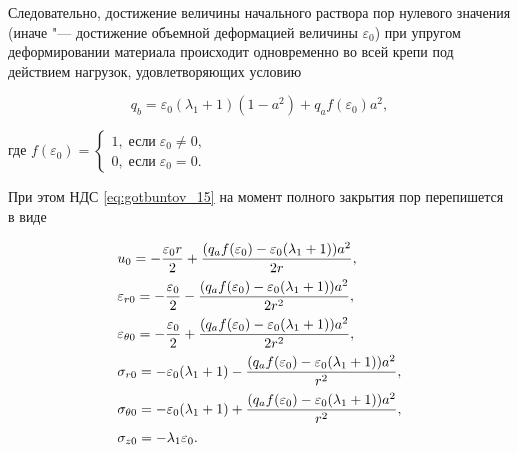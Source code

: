 Следовательно, достижение величины начального раствора пор нулевого значения (иначе "--- достижение объемной деформацией величины $\varepsilon_0$) при упругом деформировании материала происходит одновременно во всей крепи под действием нагрузок, удовлетворяющих условию 

\begin{equation} 

\label{eq:gotbuntov_17} 

q_b=\varepsilon_0(\lambda_1+1)(1-a^2)+q_a   f(\varepsilon_0)a^2,

\end{equation}                             

где $f(\varepsilon_0)=\left\{\begin{array}{c}{1, \; \text{если} \; \varepsilon_0\ne0}, \\ {0,\; \text{если} \; \varepsilon_0=0.}\end{array}\right.$



При этом НДС \eqref{eq:gotbuntov_15} на момент полного закрытия пор перепишется в виде

\begin{equation}

\begin{array}{l}

\displaystyle

u_0=-\frac{\varepsilon_0 r}{2}   +\frac{(q_a   f(\varepsilon_0)-\varepsilon_0(\lambda_1+1)) a^2}{2r}  ,

\\[3mm]

\displaystyle

\varepsilon_{r0}=-\frac{\varepsilon_0}{2}-\frac{ (q_a   f(\varepsilon_0)-\varepsilon_0(\lambda_1+1)) a^2}{2r^2} , \\[3mm]

\displaystyle

\varepsilon_{\theta0}=-\frac{\varepsilon_0}{2}+\frac{(q_a   f(\varepsilon_0)-\varepsilon_0(\lambda_1+1)) a^2}{2r^2},

\\[3mm] 

\displaystyle

\sigma_{r0}=-\varepsilon_0(\lambda_1+1)-\frac{(q_a   f(\varepsilon_0)-\varepsilon_0(\lambda_1+1))a^2}{r^2},%

\\[3mm] 

\displaystyle

\sigma_{\theta0}=-\varepsilon_0(\lambda_1+1)+\frac{(q_a   f(\varepsilon_0)-\varepsilon_0(\lambda_1+1))a^2}{r^2},

\displaystyle

\\[3mm] 

\sigma_{z0}=-\lambda_1\varepsilon_0. 

\end{array}

\label{eq:gotbuntov_18}  

\end{equation}



